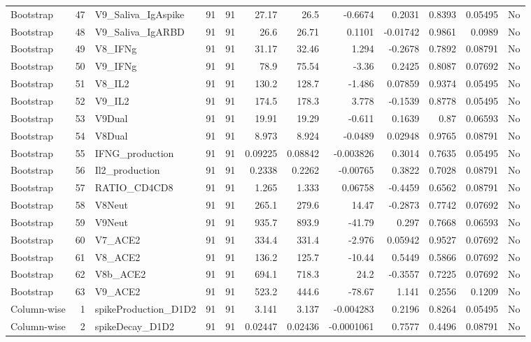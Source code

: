 \begin{longtable}{lrp{}rrrrrrrrl}
Bootstrap & 47 & V9\_Saliva\_IgAspike & 91 & 91 & 27.17 & 26.5 & -0.6674 & 0.2031 & 0.8393 & 0.05495 & No \\
Bootstrap & 48 & V9\_Saliva\_IgARBD & 91 & 91 & 26.6 & 26.71 & 0.1101 & -0.01742 & 0.9861 & 0.0989 & No \\
Bootstrap & 49 & V8\_IFNg & 91 & 91 & 31.17 & 32.46 & 1.294 & -0.2678 & 0.7892 & 0.08791 & No \\
Bootstrap & 50 & V9\_IFNg & 91 & 91 & 78.9 & 75.54 & -3.36 & 0.2425 & 0.8087 & 0.07692 & No \\
Bootstrap & 51 & V8\_IL2 & 91 & 91 & 130.2 & 128.7 & -1.486 & 0.07859 & 0.9374 & 0.05495 & No \\
Bootstrap & 52 & V9\_IL2 & 91 & 91 & 174.5 & 178.3 & 3.778 & -0.1539 & 0.8778 & 0.05495 & No \\
Bootstrap & 53 & V9Dual & 91 & 91 & 19.91 & 19.29 & -0.611 & 0.1639 & 0.87 & 0.06593 & No \\
Bootstrap & 54 & V8Dual & 91 & 91 & 8.973 & 8.924 & -0.0489 & 0.02948 & 0.9765 & 0.08791 & No \\
Bootstrap & 55 & IFNG\_production & 91 & 91 & 0.09225 & 0.08842 & -0.003826 & 0.3014 & 0.7635 & 0.05495 & No \\
Bootstrap & 56 & Il2\_production & 91 & 91 & 0.2338 & 0.2262 & -0.00765 & 0.3822 & 0.7028 & 0.08791 & No \\
Bootstrap & 57 & RATIO\_CD4CD8 & 91 & 91 & 1.265 & 1.333 & 0.06758 & -0.4459 & 0.6562 & 0.08791 & No \\
Bootstrap & 58 & V8Neut & 91 & 91 & 265.1 & 279.6 & 14.47 & -0.2873 & 0.7742 & 0.07692 & No \\
Bootstrap & 59 & V9Neut & 91 & 91 & 935.7 & 893.9 & -41.79 & 0.297 & 0.7668 & 0.06593 & No \\
Bootstrap & 60 & V7\_ACE2 & 91 & 91 & 334.4 & 331.4 & -2.976 & 0.05942 & 0.9527 & 0.07692 & No \\
Bootstrap & 61 & V8\_ACE2 & 91 & 91 & 136.2 & 125.7 & -10.44 & 0.5449 & 0.5866 & 0.07692 & No \\
Bootstrap & 62 & V8b\_ACE2 & 91 & 91 & 694.1 & 718.3 & 24.2 & -0.3557 & 0.7225 & 0.07692 & No \\
Bootstrap & 63 & V9\_ACE2 & 91 & 91 & 523.2 & 444.6 & -78.67 & 1.141 & 0.2556 & 0.1209 & No \\
Column-wise & 1 & spikeProduction\_D1D2 & 91 & 91 & 3.141 & 3.137 & -0.004283 & 0.2196 & 0.8264 & 0.05495 & No \\
Column-wise & 2 & spikeDecay\_D1D2 & 91 & 91 & 0.02447 & 0.02436 & -0.0001061 & 0.7577 & 0.4496 & 0.08791 & No \\

\end{longtable}
